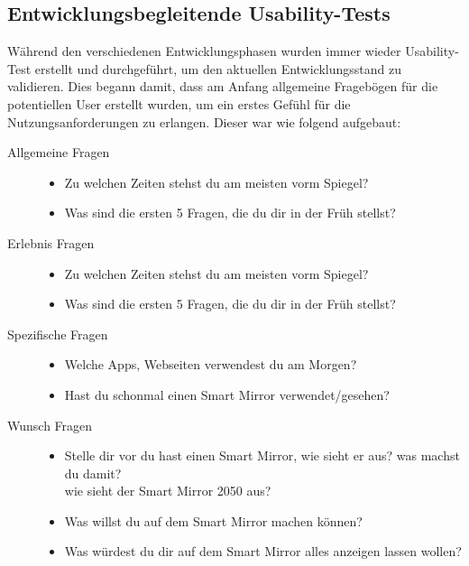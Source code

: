 \documentclass[12pt, a4paper]{scrartcl}
\begin{document}
	\subsection{Entwicklungsbegleitende Usability-Tests}
	Während den verschiedenen Entwicklungsphasen wurden immer wieder Usability-Test erstellt und durchgeführt, um den aktuellen Entwicklungsstand zu validieren.
	Dies begann damit, dass am Anfang allgemeine Fragebögen für die potentiellen User erstellt wurden, um ein erstes Gefühl für die 						Nutzungsanforderungen zu erlangen. Dieser war wie folgend aufgebaut:
	\begin{description}
		\item[Allgemeine Fragen] \hfill
		 \begin{itemize}
			\setlength{\itemsep}{-0.5em}
			\item Zu welchen Zeiten stehst du am meisten vorm Spiegel?
			\item Was sind die ersten 5 Fragen, die du dir in der Früh stellst?
		\end{itemize}
		\item[Erlebnis Fragen] \hfill
		\begin{itemize}
			\setlength{\itemsep}{-0.5em}
			\item Zu welchen Zeiten stehst du am meisten vorm Spiegel?
			\item Was sind die ersten 5 Fragen, die du dir in der Früh stellst?
		\end{itemize}
		\item[Spezifische Fragen] \hfill
			\begin{itemize}
			\setlength{\itemsep}{-0.5em}
			\item Welche Apps, Webseiten verwendest du am Morgen?
			\item Hast du schonmal einen Smart Mirror verwendet/gesehen?
			\end{itemize}
		\item[Wunsch Fragen] \hfill
			\begin{itemize}
			\setlength{\itemsep}{-0.5em}
			\item Stelle dir vor du hast einen Smart Mirror, wie sieht er aus? was machst du damit?\\
			wie sieht der Smart Mirror 2050 aus?
			\item Was willst du auf dem Smart Mirror machen können?
			\item Was würdest du dir auf dem Smart Mirror alles anzeigen lassen wollen?
			\end{itemize}
	\end{description}
\end{document}
